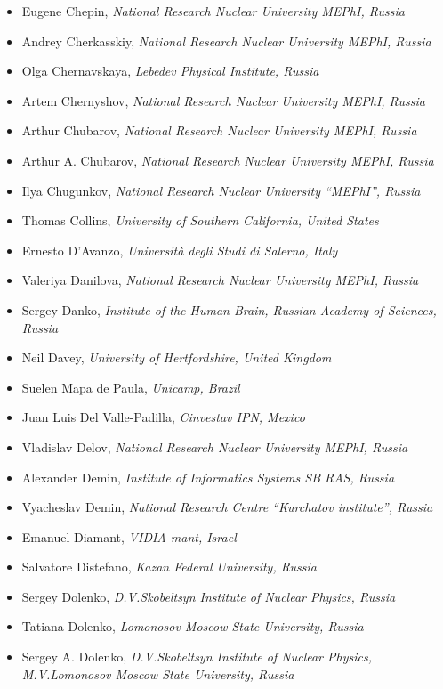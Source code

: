 \documentclass[10pt,fleqn,openany]{book} %
\begin{document}
\begin{itemize}
		\item Eugene Chepin, \textit{National Research Nuclear University MEPhI, Russia}
		\item Andrey Cherkasskiy, \textit{National Research Nuclear University MEPhI, Russia}
		\item Olga Chernavskaya, \textit{Lebedev Physical Institute, Russia}
		\item Artem Chernyshov, \textit{National Research Nuclear University MEPhI, Russia}
		\item Arthur Chubarov, \textit{National Research Nuclear University MEPhI, Russia}
		\item Arthur A. Chubarov, \textit{National Research Nuclear University MEPhI, Russia}
		\item Ilya Chugunkov, \textit{National Research Nuclear University ``MEPhI'', Russia}
		\item Thomas Collins, \textit{University of Southern California, United States}
		\item Ernesto D'Avanzo, \textit{Università degli Studi di Salerno, Italy}
		\item Valeriya Danilova, \textit{National Research Nuclear University MEPhI, Russia}
		\item Sergey Danko, \textit{Institute of the Human Brain, Russian Academy of Sciences, Russia}
		\item Neil Davey, \textit{University of Hertfordshire, United Kingdom}
		\item Suelen Mapa de Paula, \textit{Unicamp, Brazil}
		\item Juan Luis Del Valle-Padilla, \textit{Cinvestav IPN, Mexico}
		\item Vladislav Delov, \textit{National Research Nuclear University MEPhI, Russia}
		\item Alexander Demin, \textit{Institute of Informatics Systems SB RAS, Russia}
		\item Vyacheslav Demin, \textit{National Research Centre ``Kurchatov institute'', Russia}
		\item Emanuel Diamant, \textit{VIDIA-mant, Israel}
		\item Salvatore Distefano, \textit{Kazan Federal University, Russia}
		\item Sergey Dolenko, \textit{D.V.Skobeltsyn Institute of Nuclear Physics, Russia}
		\item Tatiana Dolenko, \textit{Lomonosov Moscow State University, Russia}
		\item Sergey A. Dolenko, \textit{D.V.Skobeltsyn Institute of Nuclear Physics, M.V.Lomonosov Moscow State University, Russia}

\end{itemize}
\end{document}
